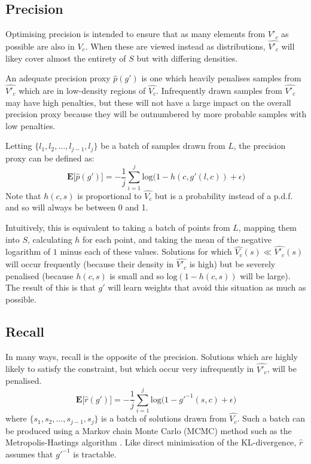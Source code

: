 \documentclass[../../main.tex]{subfiles}
\begin{document}
\subsection{Precision} \label{subsection:precision}

Optimising precision is intended to ensure that as many elements from $V'_c$ as possible are also in $V_c$.
When these are viewed instead as distributions, $\hat{V'_c}$ will likey cover almost the entirety of $S$ but with differing densities.

An adequate precision proxy $\hat{p}(g')$ is one which heavily penalises samples from $\hat{V'_c}$ which are in low-density regions of $\hat{V_c}$.
Infrequently drawn samples from $\hat{V'_c}$ may have high penalties, but these will not have a large impact on the overall precision proxy because they will be outnumbered by more probable samples with low penalties.

Letting $\{l_1,l_2,...,l_{j-1},l_j\}$ be a batch of samples drawn from $L$, the precision proxy can be defined as:
\begin{equation}
    \textbf{E}\big[\hat{p}(g')\big]=-\frac{1}{j}\sum_{i=1}^{j}\text{log}\big(1-h(c,g'(l,c))+\epsilon\big)
\end{equation}
Note that $h(c,s)$ is proportional to $\hat{V_c}$ but is a probability instead of a p.d.f. and so will always be between 0 and 1.

Intuitively, this is equivalent to taking a batch of points from $L$, mapping them into $S$, calculating $h$ for each point, and taking the mean of the negative logarithm of $1$ minus each of these values.
Solutions for which $\hat{V_c}(s)\ll\hat{V'_c}(s)$ will occur frequently (because their density in $\hat{V'_c}$ is high) but be severely penalised (because $h(c,s)$ is small and so $\text{log}(1-h(c,s))$ will be large).
The result of this is that $g'$ will learn weights that avoid this situation as much as possible.

\subsection{Recall} \label{subsection:recall}

In many ways, recall is the opposite of the precision.
Solutions which are highly likely to satisfy the constraint, but which occur very infrequently in $\hat{V'_c}$, will be penalised.
\begin{equation}
    \textbf{E}\big[\hat{r}(g')\big]=-\frac{1}{j}\sum_{i=1}^{j}\text{log}\big(1-g'^{-1}(s,c)+\epsilon\big)
\end{equation}
where $\{s_1,s_2,...,s_{j-1},s_j\}$ is a batch of solutions drawn from $\hat{V_c}$.
Such a batch can be produced using a Markov chain Monte Carlo (MCMC) method such as the Metropolis-Hastings algorithm \cite{robert16}.
Like direct minimisation of the KL-divergence, $\hat{r}$ assumes that $g'^{-1}$ is tractable.
\end{document}
